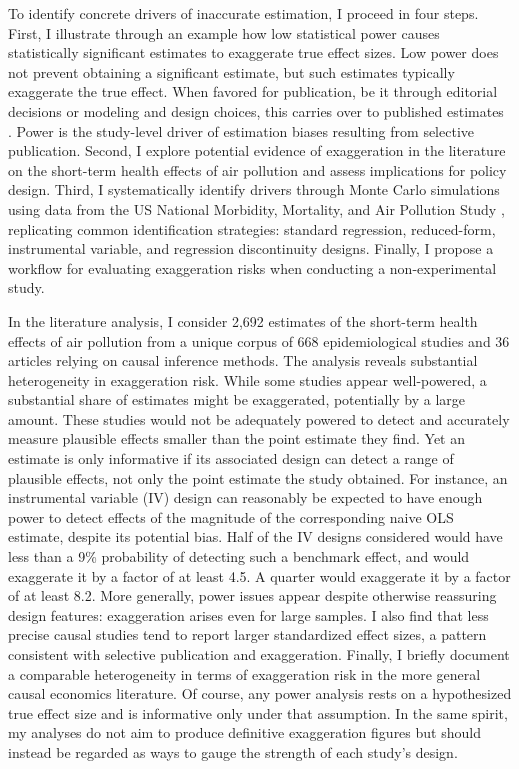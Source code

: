 \documentclass[12pt]{article}
\begin{document}
		 To identify concrete drivers of inaccurate estimation, I proceed in four steps. First, I illustrate through an example how low statistical power causes statistically significant estimates to exaggerate true effect sizes. Low power does not prevent obtaining a significant estimate, but such estimates typically exaggerate the true effect. When favored for publication, be it through editorial decisions or modeling and design choices, this carries over to published estimates \citep{gelman_type_2000, ioannidis_why_2008, gelman_beyond_2014}. Power is the study-level driver of estimation biases resulting from selective publication. Second, I explore potential evidence of exaggeration in the literature on the short-term health effects of air pollution and assess implications for policy design. Third, I systematically identify drivers through Monte Carlo simulations using data from the US National Morbidity, Mortality, and Air Pollution Study \citep{samet_national_2000}, replicating common identification strategies: standard regression, reduced-form, instrumental variable, and regression discontinuity designs. Finally, I propose a workflow for evaluating exaggeration risks when conducting a non-experimental study.
		 
		In the literature analysis, I consider 2,692 estimates of the short-term health effects of air pollution from a unique corpus of 668 epidemiological studies and 36 articles relying on causal inference methods. The analysis reveals substantial heterogeneity in exaggeration risk. While some studies appear well-powered, a substantial share of estimates might be exaggerated, potentially by a large amount. These studies would not be adequately powered to detect and accurately measure plausible effects smaller than the point estimate they find. Yet an estimate is only informative if its associated design can detect a range of plausible effects, not only the point estimate the study obtained. For instance, an instrumental variable (IV) design can reasonably be expected to have enough power to detect effects of the magnitude of the corresponding naive OLS estimate, despite its potential bias. Half of the IV designs considered would have less than a 9\% probability of detecting such a benchmark effect, and would exaggerate it by a factor of at least 4.5. A quarter would exaggerate it by a factor of at least 8.2. More generally, power issues appear despite otherwise reassuring design features: exaggeration arises even for large samples. I also find that less precise causal studies tend to report larger standardized effect sizes, a pattern consistent with selective publication and exaggeration. Finally, I briefly document a comparable heterogeneity in terms of exaggeration risk in the more general causal economics literature. Of course, any power analysis rests on a hypothesized true effect size and is informative only under that assumption. In the same spirit, my analyses do not aim to produce definitive exaggeration figures but should instead be regarded as ways to gauge the strength of each study's design.
		
\end{document}
